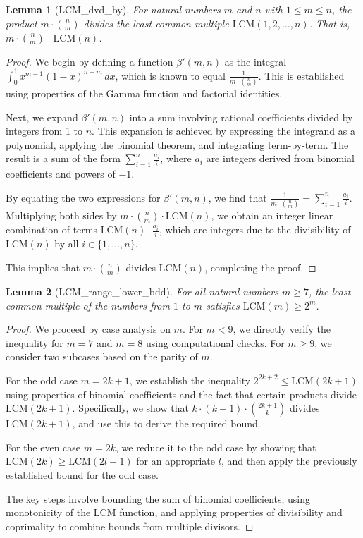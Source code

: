 \documentclass{article}
\newtheorem{lemma}{Lemma}
\begin{document}
\begin{lemma}[LCM_dvd_by]
For natural numbers \( m \) and \( n \) with \( 1 \leq m \leq n \), the product \( m \cdot \binom{n}{m} \) divides the least common multiple \( \mathrm{LCM}(1, 2, \dots, n) \). That is, \( m \cdot \binom{n}{m} \mid \mathrm{LCM}(n) \).
\end{lemma}
\begin{proof}
We begin by defining a function \( \beta'(m, n) \) as the integral \( \int_0^1 x^{m-1}(1-x)^{n-m} \, dx \), which is known to equal \( \frac{1}{m \cdot \binom{n}{m}} \). This is established using properties of the Gamma function and factorial identities.

Next, we expand \( \beta'(m, n) \) into a sum involving rational coefficients divided by integers from 1 to \( n \). This expansion is achieved by expressing the integrand as a polynomial, applying the binomial theorem, and integrating term-by-term. The result is a sum of the form \( \sum_{i=1}^n \frac{a_i}{i} \), where \( a_i \) are integers derived from binomial coefficients and powers of \( -1 \).

By equating the two expressions for \( \beta'(m, n) \), we find that \( \frac{1}{m \cdot \binom{n}{m}} = \sum_{i=1}^n \frac{a_i}{i} \). Multiplying both sides by \( m \cdot \binom{n}{m} \cdot \mathrm{LCM}(n) \), we obtain an integer linear combination of terms \( \mathrm{LCM}(n) \cdot \frac{a_i}{i} \), which are integers due to the divisibility of \( \mathrm{LCM}(n) \) by all \( i \in \{1, \dots, n\} \).

This implies that \( m \cdot \binom{n}{m} \) divides \( \mathrm{LCM}(n) \), completing the proof.
\end{proof}

\begin{lemma}[LCM_range_lower_bdd]
For all natural numbers \( m \geq 7 \), the least common multiple of the numbers from \( 1 \) to \( m \) satisfies \( \mathrm{LCM}(m) \geq 2^m \).
\end{lemma}
\begin{proof}
We proceed by case analysis on \( m \). For \( m < 9 \), we directly verify the inequality for \( m = 7 \) and \( m = 8 \) using computational checks. For \( m \geq 9 \), we consider two subcases based on the parity of \( m \).

For the odd case \( m = 2k + 1 \), we establish the inequality \( 2^{2k+2} \leq \mathrm{LCM}(2k+1) \) using properties of binomial coefficients and the fact that certain products divide \( \mathrm{LCM}(2k+1) \). Specifically, we show that \( k \cdot (k+1) \cdot \binom{2k+1}{k} \) divides \( \mathrm{LCM}(2k+1) \), and use this to derive the required bound.

For the even case \( m = 2k \), we reduce it to the odd case by showing that \( \mathrm{LCM}(2k) \geq \mathrm{LCM}(2l+1) \) for an appropriate \( l \), and then apply the previously established bound for the odd case.

The key steps involve bounding the sum of binomial coefficients, using monotonicity of the LCM function, and applying properties of divisibility and coprimality to combine bounds from multiple divisors.
\end{proof}
\end{document}
